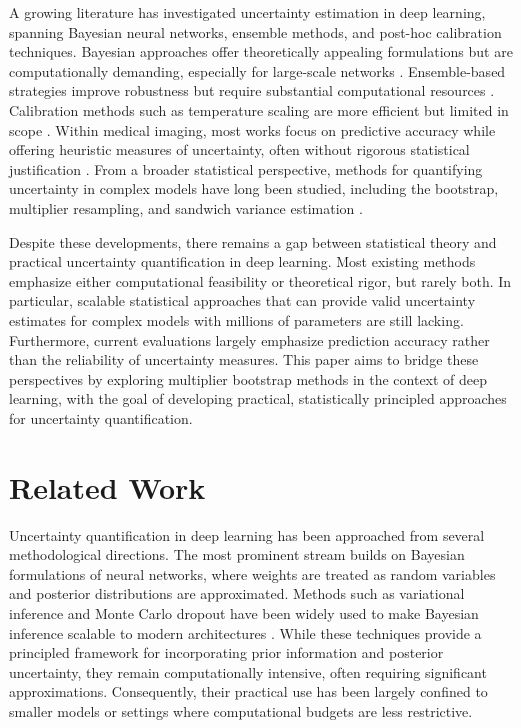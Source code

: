 \documentclass[12pt, titlepage, reqno]{article}
\begin{document}
A growing literature has investigated uncertainty estimation in deep
learning, spanning Bayesian neural networks, ensemble methods, and
post-hoc calibration techniques. Bayesian approaches offer
theoretically appealing formulations but are computationally
demanding, especially for large-scale networks
\citep{blundell2015weight, gal2016dropout}. Ensemble-based strategies
improve robustness but require substantial computational resources
\citep{lakshminarayanan2017simple}. Calibration methods such as
temperature scaling are more efficient but limited in scope
\citep{guo2017calibration}. Within medical imaging, most works focus
on predictive accuracy while offering heuristic measures of
uncertainty, often without rigorous statistical justification
\citep{mehrtash2020confidence, huang2021confidence}. From a broader
statistical perspective, methods for quantifying uncertainty in
complex models have long been studied, including the bootstrap,
multiplier resampling, and sandwich variance estimation
\citep{efron1994introduction, lahiri2003resampling, zhou2012multiplier}.


Despite these developments, there remains a gap between statistical
theory and practical uncertainty quantification in deep learning. Most
existing methods emphasize either computational feasibility or
theoretical rigor, but rarely both. In particular, scalable statistical
approaches that can provide valid uncertainty estimates for complex
models with millions of parameters are still lacking. Furthermore,
current evaluations largely emphasize prediction accuracy rather than
the reliability of uncertainty measures. This paper aims to bridge
these perspectives by exploring multiplier bootstrap methods in the
context of deep learning, with the goal of developing practical,
statistically principled approaches for uncertainty quantification.

\section{Related Work}

Uncertainty quantification in deep learning has been approached from
several methodological directions. The most prominent stream builds on
Bayesian formulations of neural networks, where weights are treated as
random variables and posterior distributions are approximated. Methods
such as variational inference and Monte Carlo dropout have been widely
used to make Bayesian inference scalable to modern architectures
\citep{blundell2015weight, gal2016dropout}. While these techniques
provide a principled framework for incorporating prior information and
posterior uncertainty, they remain computationally intensive, often
requiring significant approximations. Consequently, their practical
use has been largely confined to smaller models or settings where
computational budgets are less restrictive.
\end{document}
